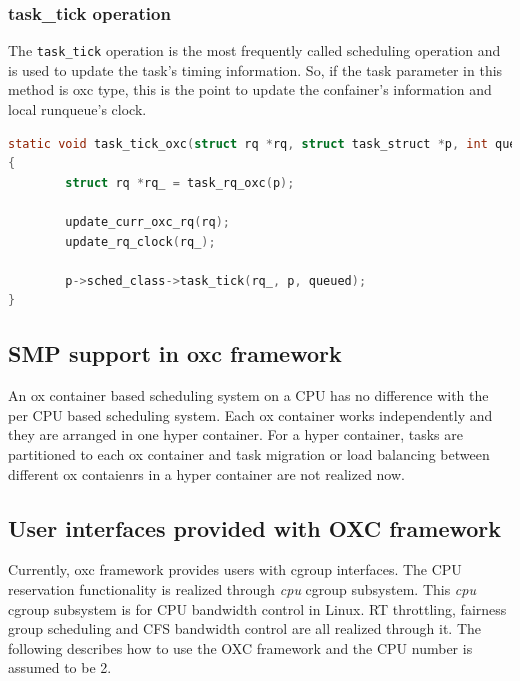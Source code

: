 \subsubsection{task\_tick operation}
The \texttt{task\_tick} operation is the most frequently called scheduling 
operation and is used to update the task's timing information. So, if
the task parameter in this method is oxc type, this is the point to
update the confainer's information and local runqueue's clock.
\begin{lstlisting}[language=C]
static void task_tick_oxc(struct rq *rq, struct task_struct *p, int queued)
{
        struct rq *rq_ = task_rq_oxc(p);

        update_curr_oxc_rq(rq);
        update_rq_clock(rq_);

        p->sched_class->task_tick(rq_, p, queued);
}
\end{lstlisting}

\subsection{SMP support in oxc framework}
An ox container based scheduling system on a CPU has no difference with the 
per CPU based scheduling system. Each ox container works independently and
they are arranged in one hyper container. For a hyper container, tasks are
partitioned to each ox container and task migration or load balancing between 
different ox contaienrs in a hyper container are not realized now.

\subsection{User interfaces provided with OXC framework}
Currently, oxc framework provides users with cgroup interfaces.
The CPU reservation functionality is realized through \emph{cpu} cgroup 
subsystem. This \emph{cpu} cgroup subsystem is for CPU bandwidth control
in Linux. RT throttling, fairness group scheduling and CFS bandwidth control
are all realized through it. The following describes how to use the OXC 
framework and the CPU number is assumed to be 2.

